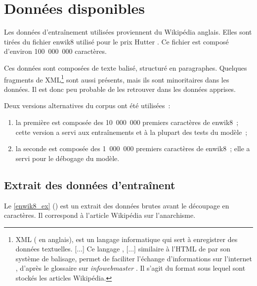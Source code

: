 \chapter{Données disponibles}
Les données d'entraînement utilisées proviennent du Wikipédia anglais.
Elles sont tirées du fichier \og enwik8\fg{} utilisé pour le prix Hutter \autocite{enwik8,Hutter2018Feb}. Ce fichier est composé d'environ 100~000~000 caractères.

Ces données sont composées de texte balisé, structuré en paragraphes.
Quelques fragments de XML\footnote{XML ( en anglais), \og est un langage informatique qui sert à enregistrer des données textuelles. [...] Ce langage , [...] similaire à l'HTML de par son système de balisage, permet de faciliter l'échange d'informations sur l'internet \fg{}, d'après le glossaire sur \emph{infowebmaster} \autocite{xml}. Il s'agit du format sous lequel sont stockés les articles Wikipédia.}
sont aussi présents, mais ils sont minoritaires dans les données. Il est donc peu probable de les retrouver dans les données apprises.

Deux versions alternatives du corpus ont été utilisées~:
\begin{enumerate}
	\item la première est composée des 10~000~000 premiers caractères de \og enwik8\fg{}~; cette version a servi aux entraînements et à la plupart des tests du modèle~; %
	\item la seconde est composée des 1~000~000 premiers caractères de \og enwik8\fg{}~; elle a servi pour le débogage du modèle. %
\end{enumerate}

\section{Extrait des données d'entraînent}
Le \autoref{enwik8_ex} () est un extrait des données brutes avant le découpage en caractères. Il correspond à l'article Wikipédia sur l'anarchisme.

